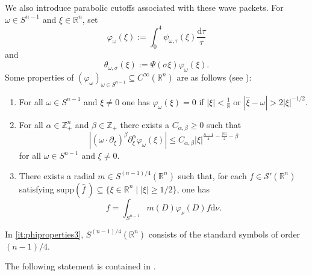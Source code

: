 \documentclass{amsart}
\newcommand {\ud}{\mathrm{d}}
\newcommand {\ph}{\varphi}
\newcommand {\R}{\mathbb R}
\newcommand {\Rn}{\mathbb{R}^{n}}
\newcommand {\supp}{\mathrm{supp}}
\newcommand {\Sw}{\mathcal{S}}
\newcommand {\w}{\omega}
\newcommand {\wh}{\widehat}
\newcommand {\Z}{\mathbb Z}
\theoremstyle{definition}
\numberwithin{equation}{section}
\begin{document}
We also introduce parabolic cutoffs associated with these wave packets. For $\w\in S^{n-1}$ and $\xi\in\Rn$, set
\begin{equation}\label{eq:phw}
\ph_{\omega}(\xi):=\int_{0}^{4}\psi_{\w,\tau}(\xi)\frac{\ud\tau}{\tau}
\end{equation}
and
\begin{equation}\label{eq:theta}
\theta_{\omega,\sigma}(\xi):=\Psi(\sigma\xi)\varphi_{\omega}(\xi).
\end{equation}
Some properties of $(\ph_{\w})_{\w\in S^{n-1}}\subseteq C^{\infty}(\Rn)$ are as follows (see \cite[Remark 3.3]{Rozendaal21}):
\begin{enumerate}
\item\label{it:phiproperties1} For all $\w\in S^{n-1}$ and $\xi\neq0$ one has $\ph_{\w}(\xi)=0$ if $|\xi|<\frac{1}{8}$ or $|\hat{\xi}-\w|>2|\xi|^{-1/2}$.
\item\label{it:phiproperties2} For all $\alpha\in\Z_{+}^{n}$ and $\beta\in\Z_{+}$ there exists a $C_{\alpha,\beta}\geq0$ such that
\[
|(\w\cdot \partial_{\xi})^{\beta}\partial^{\alpha}_{\xi}\ph_{\w}(\xi)|\leq C_{\alpha,\beta}|\xi|^{\frac{n-1}{4}-\frac{|\alpha|}{2}-\beta}
\]
for all $\w\in S^{n-1}$ and $\xi\neq0$.
\item\label{it:phiproperties3}
There exists a radial $m\in S^{(n-1)/4}(\Rn)$ such that, for each $f\in\Sw'(\Rn)$ satisfying $\supp(\wh{f}\,)\subseteq \{\xi\in\Rn\mid |\xi|\geq1/2\}$, one has
\begin{equation}\label{eq:phiproperties3}
f=\int_{S^{n-1}}m(D)\ph_{\nu}(D)f\ud\nu.
\end{equation}
\end{enumerate}
In \eqref{it:phiproperties3}, $S^{(n-1)/4}(\Rn)$ consists of the standard symbols of order $(n-1)/4$. %


The following statement is contained in \cite[Lemma 3.2]{Rozendaal21}. 
\end{document}
